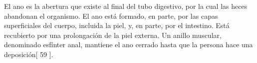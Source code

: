 El ano es la abertura que existe al final del tubo digestivo, por la cual las heces abandonan el organismo. El ano está formado, en parte, por las capas superficiales del cuerpo, 
incluida la piel, y, en parte, por el intestino. Está recubierto por una prolongación de la piel externa. Un anillo muscular, denominado esfínter anal, mantiene el ano cerrado hasta 
que la persona hace una deposición[ 59 ].




